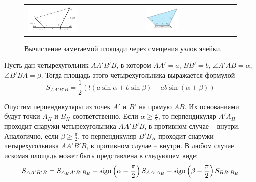 \begin{figure}[ht]
\centering
\begin{tabular}{ll}
	\includegraphics[width=0.45\textwidth]{fig/2dr_remesh_local.pdf}
	&
	\includegraphics[width=0.38\textwidth]{fig/2dr_remesh_local2.pdf}
\end{tabular}
\singlespacing
{}\caption{Вычисление заметаемой площади через смещения узлов ячейки.}
\label{fig:text_1_remesh_2d_local}
\end{figure}

\begin{lemma}\label{lem:text_1_remesh_2d_AA1B1B}
Пусть дан четырехугольник $AA'B'B$, в котором $AA' = a$, $BB' = b$, $\angle A'AB = \alpha$, $\angle B'BA = \beta$.
Тогда площадь этого четырехугольника выражается формулой
\begin{equation}\label{eqn:text_1_remesh_2d_one_cell_lemma}
S_{AA'B'B} = \frac{1}{2} \left( l (a \sin \alpha + b \sin \beta) - ab \sin (\alpha + \beta) \right)
\end{equation}
\end{lemma}

Опустим перпендикуляры из точек $A'$ и $B'$ на прямую $AB$.
Их основаниями будут точки $A_H$ и $B_H$ соответственно.
Если $\alpha \ge \frac{\pi}{2}$, то перпендикуляр $A'A_H$ проходит снаружи четырехугольника $AA'B'B$, в противном случае -- внутри.
Аналогично, если $\beta \ge \frac{\pi}{2}$, то перпендикуляр $B'B_H$ проходит снаружи четырехугольника $AA'B'B$, в противном случае -- внутри.
В любом случае искомая площадь может быть представлена в следующем виде:
\begin{equation}
S_{AA'B'B} = S_{A_HA'B'B_H} - \operatorname{sign} \left( \alpha - \frac{\pi}{2} \right) S_{AA'A_H} - \operatorname{sign} \left( \beta - \frac{\pi}{2} \right) S_{BB'B_H}
\end{equation}

